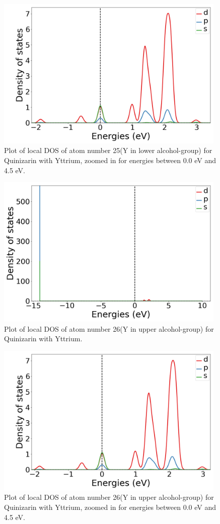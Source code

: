 \documentclass{article}
\begin{document}
  \begin{figure}[H]
      \centering
      \includegraphics[width = 11cm]{../fig/Y_LDOS25_2.png}
      \caption{Plot of local DOS of atom number 25(Y in lower alcohol-group) for Quinizarin with Yttrium, zoomed in for energies between 0.0 eV and 4.5 eV. }
      \label{fig:Y_LDOS25_2.png}
  \end{figure}

  \begin{figure}[H]
      \centering
      \includegraphics[width = 11cm]{../fig/Y_LDOS26_1.png}
      \caption{Plot of local DOS of atom number 26(Y in upper alcohol-group) for Quinizarin with Yttrium. }
      \label{fig:Y_LDOS26_1.png}
  \end{figure}

  \begin{figure}[H]
      \centering
      \includegraphics[width = 11cm]{../fig/Y_LDOS26_2.png}
      \caption{Plot of local DOS of atom number 26(Y in upper alcohol-group) for Quinizarin with Yttrium, zoomed in for energies between 0.0 eV and 4.5 eV. }
      \label{fig:Y_LDOS26_2.png}
  \end{figure}
\end{document}
